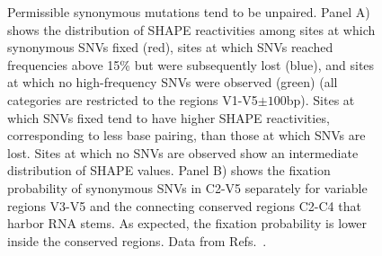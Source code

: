 \documentclass[rmp, twocolumn]{revtex4}
\newcommand{\shankaregion}{C2-V5}
\begin{document}
\begin{figure}
\begin{center}
\caption{Permissible synonymous mutations tend to be unpaired.
Panel A) shows the distribution of SHAPE reactivities among sites at which synonymous 
SNVs fixed (red), sites at which SNVs reached frequencies above 15\% but
were subsequently lost (blue), and sites at which no high-frequency SNVs were observed (green) 
(all categories are restricted to the regions V1-V5$\pm 100$bp).
Sites at which SNVs fixed tend to have higher SHAPE reactivities, corresponding to
less base pairing, than those at which SNVs are lost.
Sites at which no SNVs are observed show an intermediate distribution of SHAPE values.
Panel B) shows the fixation probability of synonymous SNVs in
\shankaregion{} separately for variable regions V3-V5 and the connecting conserved 
regions C2-C4 that harbor RNA stems. As expected, the fixation probability is lower
inside the conserved regions. Data from Refs.~\cite{shankarappa_consistent_1999,
bunnik_autologous_2008, liu_selection_2006}.}
\label{fig:SHAPE}
\end{center}
\end{figure}
\end{document}
